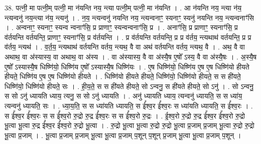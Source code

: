 \documentclass[17pt]{extarticle}
\begin{document}
38. पत्नी॒ मा पत्नी॒म् पत्नी॒ मा न॑यन्ति नय॒ न्त्या पत्नी॒म् पत्नी॒ मा न॑यन्ति । . आ न॑यन्ति नय॒ न्त्या न॑य॒ न्त्यन्वनु॑ नय॒न्त्या न॑य॒ न्त्यनु॑ । . न॒य॒ न्त्यन्वनु॑ नयन्ति नय॒ न्त्यन्वनाꣳ॒॒ स्यनाꣳ॒॒ स्यनु॑ नयन्ति नय॒ न्त्यन्वनाꣳ॑सि । . अन्वनाꣳ॒॒ स्यनाꣳ॒॒ स्यन्व न्वनाꣳ॑सि॒ प्र प्राणाꣳ॒॒ स्यन्वन्वनाꣳ॑सि॒ प्र । . अनाꣳ॑सि॒ प्र प्राणाꣳ॒॒ स्यनाꣳ॑सि॒ प्र व॑र्तयन्ति वर्तयन्ति॒ प्राणाꣳ॒॒ स्यनाꣳ॑सि॒ प्र व॑र्तयन्ति । . प्र व॑र्तयन्ति वर्तयन्ति॒ प्र प्र व॑र्तय॒ न्त्यथाथ॑ वर्तयन्ति॒ प्र प्र व॑र्तय॒ न्त्यथ॑ । . व॒र्त॒य॒ न्त्यथाथ॑ वर्तयन्ति वर्तय॒ न्त्यथ॒ वै वा अथ॑ वर्तयन्ति वर्तय॒ न्त्यथ॒ वै । . अथ॒ वै वा अथाथ॒ वा अ॑स्यास्य॒ वा अथाथ॒ वा अ॑स्य । . वा अ॑स्यास्य॒ वै वा अ॑स्यै॒ष ए॒षो᳚ ऽस्य॒ वै वा अ॑स्यै॒षः । . अ॒स्यै॒ष ए॒षो᳚ ऽस्यास्यै॒ष धिष्णि॑यो॒ धिष्णि॑य ए॒षो᳚ ऽस्यास्यै॒ष धिष्णि॑यः । . ए॒ष धिष्णि॑यो॒ धिष्णि॑य ए॒ष ए॒ष धिष्णि॑यो हीयते हीयते॒ धिष्णि॑य ए॒ष ए॒ष धिष्णि॑यो हीयते । . धिष्णि॑यो हीयते हीयते॒ धिष्णि॑यो॒ धिष्णि॑यो हीयते॒ स स ही॑यते॒ धिष्णि॑यो॒ धिष्णि॑यो हीयते॒ सः । . ही॒य॒ते॒ स स ही॑यते हीयते॒ सो ऽन्वनु॒ स ही॑यते हीयते॒ सो ऽनु॑ । . सो ऽन्वनु॒ स सो ऽनु॑ ध्यायति ध्याय॒ त्यनु॒ स सो ऽनु॑ ध्यायति । . अनु॑ ध्यायति ध्याय॒ त्यन्वनु॑ ध्यायति॒ स स ध्या॑य॒ त्यन्वनु॑ ध्यायति॒ सः । . ध्या॒य॒ति॒ स स ध्या॑यति ध्यायति॒ स ई᳚श्व॒र ई᳚श्व॒रः स ध्या॑यति ध्यायति॒ स ई᳚श्व॒रः । . स ई᳚श्व॒र ई᳚श्व॒रः स स ई᳚श्व॒रो रु॒द्रो रु॒द्र ई᳚श्व॒रः स स ई᳚श्व॒रो रु॒द्रः । . ई॒श्व॒रो रु॒द्रो रु॒द्र ई᳚श्व॒र ई᳚श्व॒रो रु॒द्रो भू॒त्वा भू॒त्वा रु॒द्र ई᳚श्व॒र ई᳚श्व॒रो रु॒द्रो भू॒त्वा । . रु॒द्रो भू॒त्वा भू॒त्वा रु॒द्रो रु॒द्रो भू॒त्वा प्र॒जाम् प्र॒जाम् भू॒त्वा रु॒द्रो रु॒द्रो भू॒त्वा प्र॒जाम् । . भू॒त्वा प्र॒जाम् प्र॒जाम् भू॒त्वा भू॒त्वा प्र॒जाम् प॒शून् प॒शून् प्र॒जाम् भू॒त्वा भू॒त्वा प्र॒जाम् प॒शून् । \newline
\end{document}
